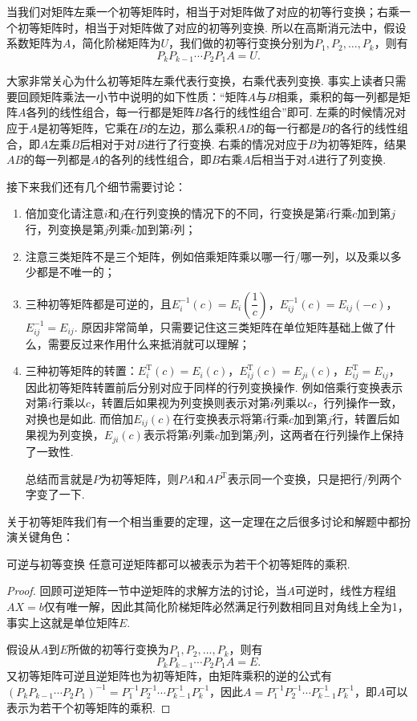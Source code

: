 当我们对矩阵左乘一个初等矩阵时，相当于对矩阵做了对应的初等行变换；右乘一个初等矩阵时，相当于对矩阵做了对应的初等列变换. 所以在高斯消元法中，假设系数矩阵为$A$，简化阶梯矩阵为$U$，我们做的初等行变换分别为$P_1,P_2,\ldots,P_k$，则有
\[P_kP_{k-1}\cdots P_2P_1A=U.\]

大家非常关心为什么初等矩阵左乘代表行变换，右乘代表列变换. 事实上读者只需要回顾矩阵乘法一小节中说明的如下性质：``矩阵$A$与$B$相乘，乘积的每一列都是矩阵$A$各列的线性组合，每一行都是矩阵$B$各行的线性组合''即可. 左乘的时候情况对应于$A$是初等矩阵，它乘在$B$的左边，那么乘积$AB$的每一行都是$B$的各行的线性组合，即$A$左乘$B$后相对于对$B$进行了行变换. 右乘的情况对应于$B$为初等矩阵，结果$AB$的每一列都是$A$的各列的线性组合，即$B$右乘$A$后相当于对$A$进行了列变换.

接下来我们还有几个细节需要讨论：
\begin{enumerate}
    \item 倍加变化请注意$i$和$j$在行列变换的情况下的不同，行变换是第$i$行乘$c$加到第$j$行，列变换是第$j$列乘$c$加到第$i$列；

    \item 注意三类矩阵不是三个矩阵，例如倍乘矩阵乘以哪一行/哪一列，以及乘以多少都是不唯一的；

    \item 三种初等矩阵都是可逆的，且$E_i^{-1}(c)=E_i\left(\dfrac{1}{c}\right)$，$E_{ij}^{-1}(c)=E_{ij}(-c)$，$E_{ij}^{-1}=E_{ij}$. 原因非常简单，只需要记住这三类矩阵在单位矩阵基础上做了什么，需要反过来作用什么来抵消就可以理解；

    \item 三种初等矩阵的转置：$E_i^\mathrm{T}(c)=E_i(c)$，$E_{ij}^\mathrm{T}(c)=E_{ji}(c)$，$E_{ij}^\mathrm{T}=E_{ij}$，因此初等矩阵转置前后分别对应于同样的行列变换操作. 例如倍乘行变换表示对第$i$行乘以$c$，转置后如果视为列变换则表示对第$i$列乘以$c$，行列操作一致，对换也是如此. 而倍加$E_{ij}(c)$在行变换表示将第$i$行乘$c$加到第$j$行，转置后如果视为列变换，$E_{ji}(c)$表示将第$i$列乘$c$加到第$j$列，这两者在行列操作上保持了一致性.

          总结而言就是$P$为初等矩阵，则$PA$和$AP^\mathrm{T}$表示同一个变换，只是把行/列两个字变了一下.
\end{enumerate}

关于初等矩阵我们有一个相当重要的定理，这一定理在之后很多讨论和解题中都扮演关键角色：
\begin{theorem}{}{可逆与初等变换}
    任意可逆矩阵都可以被表示为若干个初等矩阵的乘积.
\end{theorem}

\begin{proof}
    回顾可逆矩阵一节中逆矩阵的求解方法的讨论，当$A$可逆时，线性方程组$AX=b$仅有唯一解，因此其简化阶梯矩阵必然满足行列数相同且对角线上全为1，事实上这就是单位矩阵$E$.

    假设从$A$到$E$所做的初等行变换为$P_1,P_2,\ldots,P_k$，则有
    \[P_kP_{k-1}\cdots P_2P_1A=E.\]
    又初等矩阵可逆且逆矩阵也为初等矩阵，由矩阵乘积的逆的公式有$(P_kP_{k-1}\cdots P_2P_1)^{-1}=P_1^{-1}P_2^{-1}\cdots P_{k-1}^{-1}P_k^{-1}$，因此$A=P_1^{-1}P_2^{-1}\cdots P_{k-1}^{-1}P_k^{-1}$，即$A$可以表示为若干个初等矩阵的乘积.
\end{proof}

